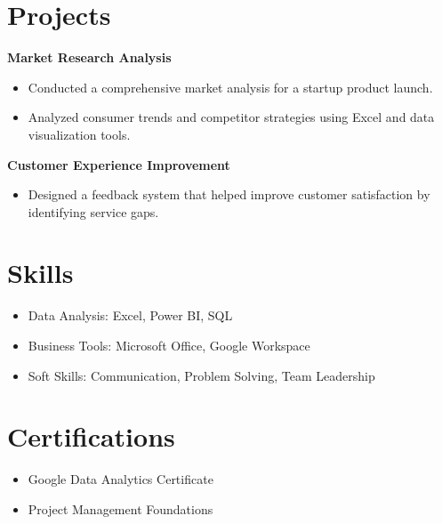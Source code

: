 \documentclass[letterpaper,11pt]{article}
\begin{document}
\section*{Projects}

\textbf{Market Research Analysis}
\begin{itemize}[leftmargin=*]
\item Conducted a comprehensive market analysis for a startup product launch.
\item Analyzed consumer trends and competitor strategies using Excel and data visualization tools.
\end{itemize}

\textbf{Customer Experience Improvement}
\begin{itemize}[leftmargin=*]
\item Designed a feedback system that helped improve customer satisfaction by identifying service gaps.
\end{itemize}

\section*{Skills}
\begin{itemize}[leftmargin=*]
\item Data Analysis: Excel, Power BI, SQL
\item Business Tools: Microsoft Office, Google Workspace
\item Soft Skills: Communication, Problem Solving, Team Leadership
\end{itemize}

\section*{Certifications}
\begin{itemize}[leftmargin=*]
\item Google Data Analytics Certificate
\item Project Management Foundations
\end{itemize}
\end{document}
